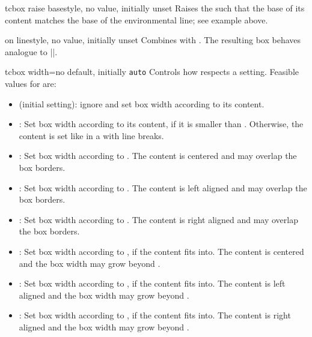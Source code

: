 \begin{docTcbKey}{tcbox raise base}{}{style, no value, initially unset}
  Raises the  such that the base of its content matches
  the base of the environmental line; see example above.
\end{docTcbKey}

\begin{docTcbKey}{on line}{}{style, no value, initially unset}
  Combines  with .
  The resulting box behaves analogue to |\fbox|.
\end{docTcbKey}

\clearpage
\begin{docTcbKey}[][doc new=2015-03-23]{tcbox width}{=}{no default, initially \texttt{auto}}
Controls how  respects a  setting.
Feasible values for  are:
\begin{itemize}
\item{} (initial setting):
  ignore  and set box width according to its content.
\item{}:
  Set box width according to its content, if it is smaller than .
  Otherwise, the content is set like in a  with line breaks.
\item{}:
  Set box width according to .
  The content is centered and may overlap the box borders.
\item{}:
  Set box width according to .
  The content is left aligned and may overlap the box borders.
\item{}:
  Set box width according to .
  The content is right aligned and may overlap the box borders.
\item{}:
  Set box width according to , if the content fits into.
  The content is centered and the box width may grow beyond .
\item{}:
  Set box width according to , if the content fits into.
  The content is left aligned and the box width may grow beyond .
\item{}:
  Set box width according to , if the content fits into.
  The content is right aligned and the box width may grow beyond .
\end{itemize}


\end{docTcbKey}
